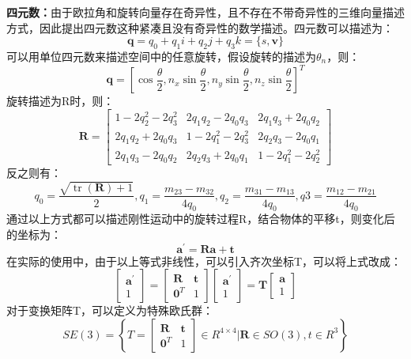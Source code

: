 \textbf{四元数：}由于欧拉角和旋转向量存在奇异性，且不存在不带奇异性的三维向量描述方式，因此提出四元数这种紧凑且没有奇异性的数学描述。四元数可以描述为：
\begin{equation}
  \mathbf{q}=q_{0}+q_{1} i+q_{2} j+q_{3} k=\{s, \mathbf{v}\}
\end{equation}
可以用单位四元数来描述空间中的任意旋转，假设旋转的描述为$\theta_{n}$，则：
\begin{equation}
  \mathbf{q}=\left[\cos \frac{\theta}{2}, n_{x} \sin \frac{\theta}{2}, n_{y} \sin \frac{\theta}{2}, n_{z} \sin \frac{\theta}{2}\right]^{T}
\end{equation}
旋转描述为R时，则：
\begin{equation}
\mathbf{R}=\left[\begin{array}{ccc}{1-2 q_{2}^{2}-2 q_{3}^{2}} & {2 q_{1} q_{2}-2 q_{0} q_{3}} & {2 q_{1} q_{3}+2 q_{0} q_{2}} \\ {2 q_{1} q_{2}+2 q_{0} q_{3}} & {1-2 q_{1}^{2}-2 q_{3}^{2}} & {2 q_{2} q_{3}-2 q_{0} q_{1}} \\ {2 q_{1} q_{3}-2 q_{0} q_{2}} & {2 q_{2} q_{3}+2 q_{0} q_{1}} & {1-2 q_{1}^{2}-2 q_{2}^{2}}\end{array}\right]
\end{equation}
反之则有：
\begin{equation}
  q_{0}=\frac{\sqrt{\operatorname{tr}(\mathbf{R})+1}}{2}, q_{1}=\frac{m_{23}-m_{32}}{4 q_{0}}, q_{2}=\frac{m_{31}-m_{13}}{4 q_{0}}, q 3=\frac{m_{12}-m_{21}}{4 q_{0}}
\end{equation}
通过以上方式都可以描述刚性运动中的旋转过程R，结合物体的平移t，则变化后的坐标为：
\begin{equation}
  \mathbf{a}^{\prime}=\mathbf{R} \mathbf{a}+\mathbf{t}
\end{equation}
在实际的使用中，由于以上等式非线性，可以引入齐次坐标T，可以将上式改成：
\begin{equation}
\left[\begin{array}{l}{\mathbf{a}^{\prime}} \\ {1}\end{array}\right]=\left[\begin{array}{ll}{\mathbf{R}} & {\mathbf{t}} \\ {\mathbf{0}^{T}} & {1}\end{array}\right]\left[\begin{array}{l}{\mathbf{a}^{\prime}} \\ {1}\end{array}\right]=\mathbf{T}\left[\begin{array}{l}{\mathbf{a}} \\ {1}\end{array}\right]
\end{equation}
对于变换矩阵T，可以定义为特殊欧氏群：
\begin{equation}
S E(3)=\left\{T=\left[\begin{array}{cc}{\mathbf{R}} & {\mathbf{t}} \\ {\mathbf{0}^{T}} & {1}\end{array}\right] \in R^{4 \times 4} | \mathbf{R} \in S O(3), t \in R^{3}\right\}
\end{equation}

